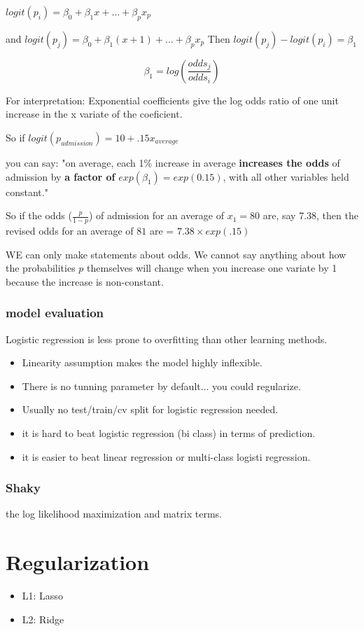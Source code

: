 \documentclass{article}
\begin{document}
$logit(p_i) = \beta_0 + \beta_1x + \dots + \beta_p x_p$

and 
$logit(p_j) = \beta_0 + \beta_1(x+1) + \dots + \beta_p x_p$
Then $logit(p_j)-logit(p_i) = \beta_1$

\[
\beta_1 = log(\frac{odds_j}{odds_i})
\]

For interpretation:
Exponential coefficients give the log odds ratio of one unit increase in the x variate of the coeficient.

So if $logit(p_{admission}) = 10+.15x_{average}$

you can say: "on average, each 1\% increase in average \textbf{increases the odds} of admission by \textbf{a factor of} $exp(\beta_1) = exp(0.15)$, with all other variables held constant."

So if the odds ($\frac{p}{1-p}$) of admission for an average of $x_1 = 80$ are, say 7.38, then the revised odds for an average of $81$ are = $7.38 \times exp(.15)$

WE can only make statements about odds. We cannot say anything about how the probabilities $p$ themselves will change when you increase one variate by 1 because the increase is non-constant. 

\subsubsection{model evaluation}
Logistic regression is less prone to overfitting than other learning methods.
\begin{itemize}
\item Linearity assumption makes the model highly inflexible.
\item There is no tunning parameter by default... you could regularize.
\item Usually no test/train/cv split for logistic regression needed.
\item it is hard to beat logistic regression (bi class) in terms of prediction. 
\item it is easier to beat linear regression or multi-class logisti regression.
\end{itemize}

\subsubsection{Shaky}
the log likelihood maximization and matrix terms.


\section{Regularization}
\begin{itemize}
\item L1: Lasso
\item L2: Ridge
\end{itemize}
\end{document}
